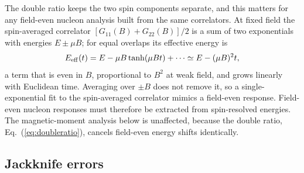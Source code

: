 \documentclass[aps,prd,reprint,twocolumn,superscriptaddress,nofootinbib,longbibliography]{revtex4-2}
\begin{document}
The double ratio keeps the two spin components separate, and this matters for any field-even nucleon analysis built from the same correlators. At fixed field the spin-averaged correlator $[G_{11}(B)+G_{22}(B)]/2$ is a sum of two exponentials with energies $E\pm\mu B$; for equal overlaps its effective energy is
\begin{equation}
E_{\rm eff}(t)=E-\mu B\tanh(\mu B t)+\cdots\simeq E-(\mu B)^2 t,
\label{eq:spinavg}
\end{equation}
a term that is even in $B$, proportional to $B^2$ at weak field, and grows linearly with Euclidean time. Averaging over $\pm B$ does not remove it, so a single-exponential fit to the spin-averaged correlator mimics a field-even response. Field-even nucleon responses must therefore be extracted from spin-resolved energies. The magnetic-moment analysis below is unaffected, because the double ratio, Eq.~(\ref{eq:doubleratio}), cancels field-even energy shifts identically.

\subsection{Jackknife errors}
\end{document}
